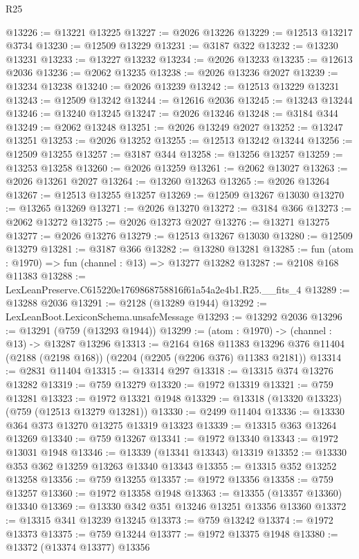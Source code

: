 \begin{lexlean}{R25}
\begin{coremodule}
@13226 := @13221 @13225
@13227 := @2026 @13226
@13229 := @12513 @13217 @3734
@13230 := @12509 @13229
@13231 := @3187 @322
@13232 := @13230 @13231
@13233 := @13227 @13232
@13234 := @2026 @13233
@13235 := @12613 @2036
@13236 := @2062 @13235
@13238 := @2026 @13236 @2027
@13239 := @13234 @13238
@13240 := @2026 @13239
@13242 := @12513 @13229 @13231
@13243 := @12509 @13242
@13244 := @12616 @2036
@13245 := @13243 @13244
@13246 := @13240 @13245
@13247 := @2026 @13246
@13248 := @3184 @344
@13249 := @2062 @13248
@13251 := @2026 @13249 @2027
@13252 := @13247 @13251
@13253 := @2026 @13252
@13255 := @12513 @13242 @13244
@13256 := @12509 @13255
@13257 := @3187 @344
@13258 := @13256 @13257
@13259 := @13253 @13258
@13260 := @2026 @13259
@13261 := @2062 @13027
@13263 := @2026 @13261 @2027
@13264 := @13260 @13263
@13265 := @2026 @13264
@13267 := @12513 @13255 @13257
@13269 := @12509 @13267 @13030
@13270 := @13265 @13269
@13271 := @2026 @13270
@13272 := @3184 @366
@13273 := @2062 @13272
@13275 := @2026 @13273 @2027
@13276 := @13271 @13275
@13277 := @2026 @13276
@13279 := @12513 @13267 @13030
@13280 := @12509 @13279
@13281 := @3187 @366
@13282 := @13280 @13281
@13285 := fun (atom : @1970) => fun (channel : @13) => @13277 @13282
@13287 := @2108 @168 @11383
@13288 := LexLeanPreserve.C615220e1769868758816f61a54a2e4b1.R25.__fits_4
@13289 := @13288 @2036
@13291 := @2128 (@13289 @1944)
@13292 := LexLeanBoot.LexiconSchema.unsafeMessage
@13293 := @13292 @2036
@13296 := @13291 (@759 (@13293 @1944))
@13299 := (atom : @1970) -> (channel : @13) -> @13287 @13296
@13313 := @2164
    @168
    @11383
    @13296
    @376
    @11404
    (@2188 (@2198 @168))
    (@2204 (@2205 (@2206 @376) @11383 @2181))
@13314 := @2831 @11404
@13315 := @13314 @297
@13318 := @13315 @374 @13276 @13282
@13319 := @759 @13279
@13320 := @1972 @13319
@13321 := @759 @13281
@13323 := @1972 @13321 @1948
@13329 := @13318 (@13320 @13323) (@759 (@12513 @13279 @13281))
@13330 := @2499 @11404
@13336 := @13330 @364 @373 @13270 @13275 @13319 @13323
@13339 := @13315 @363 @13264 @13269
@13340 := @759 @13267
@13341 := @1972 @13340
@13343 := @1972 @13031 @1948
@13346 := @13339 (@13341 @13343) @13319
@13352 := @13330 @353 @362 @13259 @13263 @13340 @13343
@13355 := @13315 @352 @13252 @13258
@13356 := @759 @13255
@13357 := @1972 @13356
@13358 := @759 @13257
@13360 := @1972 @13358 @1948
@13363 := @13355 (@13357 @13360) @13340
@13369 := @13330 @342 @351 @13246 @13251 @13356 @13360
@13372 := @13315 @341 @13239 @13245
@13373 := @759 @13242
@13374 := @1972 @13373
@13375 := @759 @13244
@13377 := @1972 @13375 @1948
@13380 := @13372 (@13374 @13377) @13356

\end{coremodule}
\end{lexlean}
